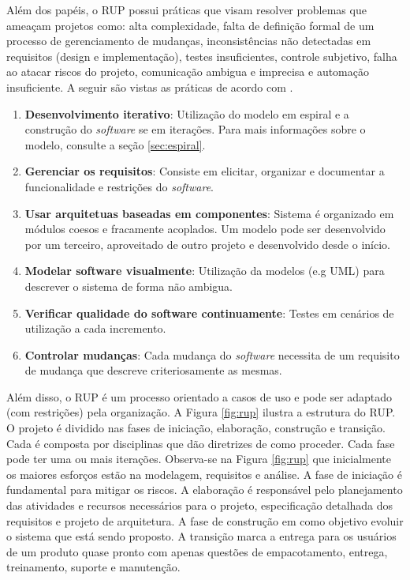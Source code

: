Além dos papéis, o RUP possui práticas que visam resolver problemas que ameaçam projetos como: alta complexidade, falta de definição formal de um processo de gerenciamento de mudanças, inconsistências não detectadas em requisitos (design e implementação), testes insuficientes, controle subjetivo, falha ao atacar riscos do projeto, comunicação ambigua e imprecisa e automação insuficiente. A seguir são vistas as práticas de acordo com .

\begin{enumerate}
\item \textbf{Desenvolvimento iterativo}: Utilização do modelo em espiral e a construção do \textit{software} se em iterações. Para mais informações sobre o modelo, consulte a seção \ref{sec:espiral}.
\item \textbf{Gerenciar os requisitos}: Consiste em elicitar, organizar e documentar a funcionalidade e restrições do \textit{software}.
\item \textbf{Usar arquitetuas baseadas em componentes}: Sistema é organizado em módulos coesos e fracamente acoplados. Um modelo pode ser desenvolvido por um terceiro, aproveitado de outro projeto e desenvolvido desde o início.
\item \textbf{Modelar software visualmente}: Utilização da modelos (e.g UML) para descrever o sistema de forma não ambigua.
\item \textbf{Verificar qualidade do software continuamente}: Testes em cenários de utilização a cada incremento.
\item \textbf{Controlar mudanças}: Cada mudança do \textit{software} necessita de um requisito de mudança que descreve criteriosamente as mesmas. 
\end{enumerate}
  
Além disso, o RUP é um processo orientado a casos de uso e pode ser adaptado (com restrições) pela organização. A Figura \ref{fig:rup} ilustra a estrutura do RUP. O projeto é dividido nas fases de iniciação, elaboração, construção e transição. Cada é composta por disciplinas que dão diretrizes de como proceder. Cada fase pode ter uma ou mais iterações. Observa-se na Figura \ref{fig:rup} que inicialmente os maiores esforços estão na modelagem, requisitos e análise. A fase de iniciação é fundamental para mitigar os riscos. A elaboração é responsável pelo planejamento das atividades e recursos necessários para o projeto, especificação detalhada dos requisitos e projeto de arquitetura. A fase de construção em como objetivo evoluir o sistema que está sendo proposto. A transição marca a entrega para os usuários de um produto quase pronto com apenas questões de empacotamento, entrega, treinamento, suporte e manutenção.


